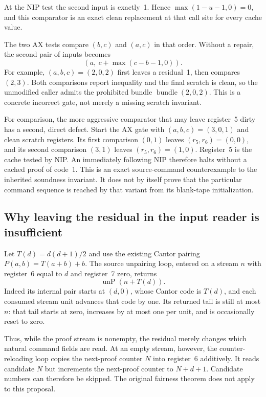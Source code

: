 At the NIP test the second input is exactly~1.  Hence
$\max(1-u-1,0)=0$, and this comparator is an exact clean replacement at
that call site for every cache value.

The two AX tests compare $(b,c)$ and $(a,c)$ in that order.  Without a
repair, the second pair of inputs becomes
\[
 (a,\ c+\max(c-b-1,0)).
\]
For example, $(a,b,c)=(2,0,2)$ first leaves a residual~1, then compares
$(2,3)$.  Both comparisons report inequality and the final scratch is
clean, so the unmodified caller admits the prohibited bundle
$\operatorname{bundle}(2,0,2)$.  This is a concrete incorrect gate,
not merely a missing scratch invariant.

For comparison, the more aggressive comparator that may leave register~5
dirty has a second, direct defect.  Start the AX gate with
$(a,b,c)=(3,0,1)$ and clean scratch registers.  Its first comparison
$(0,1)$ leaves $(r_5,r_6)=(0,0)$, and its second comparison $(3,1)$ leaves
$(r_5,r_6)=(1,0)$.  Register~5 is the cache tested by NIP.  An immediately
following NIP therefore halts without a cached proof of code~1.  This is
an exact source-command counterexample to the inherited soundness
invariant.  It does not by itself prove that the particular command
sequence is reached by that variant from its blank-tape initialization.

\subsection{Why leaving the residual in the input reader is insufficient}

Let $T(d)=d(d+1)/2$ and use the existing Cantor pairing
$P(a,b)=T(a+b)+b$.  The source unpairing loop, entered on a stream $n$
with register~6 equal to $d$ and register~7 zero, returns
\[
 \operatorname{unP}(n+T(d)).
\]
Indeed its internal pair starts at $(d,0)$, whose Cantor code is $T(d)$,
and each consumed stream unit advances that code by one.  Its returned
tail is still at most $n$: that tail starts at zero, increases by at most
one per unit, and is occasionally reset to zero.

Thus, while the proof stream is nonempty, the residual merely changes
which natural command fields are read.  At an empty stream, however, the
counter-reloading loop copies the next-proof counter $N$ into register~6
additively.  It reads candidate $N$ but increments the next-proof counter
to $N+d+1$.  Candidate numbers can therefore be skipped.  The original
fairness theorem does not apply to this proposal.

